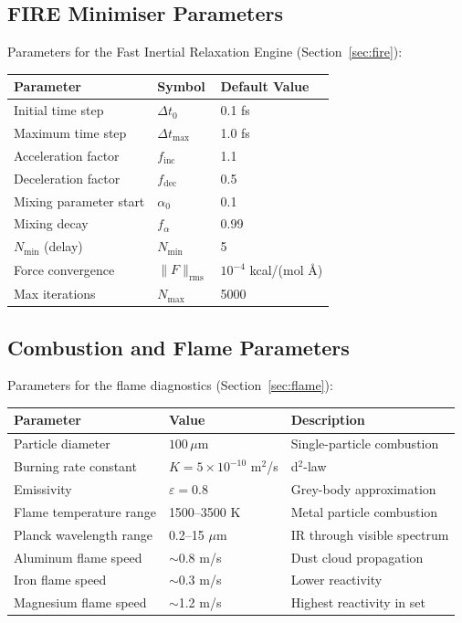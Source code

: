 \documentclass[11pt,a4paper]{article}
\begin{document}
\subsection{FIRE Minimiser Parameters}

Parameters for the Fast Inertial Relaxation Engine
(Section~\ref{sec:fire}):

\begin{center}
\begin{tabular}{lll}
\toprule
\textbf{Parameter} & \textbf{Symbol} & \textbf{Default Value} \\
\midrule
Initial time step      & $\Delta t_0$     & 0.1 fs \\
Maximum time step      & $\Delta t_{\max}$ & 1.0 fs \\
Acceleration factor    & $f_{\text{inc}}$  & 1.1 \\
Deceleration factor    & $f_{\text{dec}}$  & 0.5 \\
Mixing parameter start & $\alpha_0$        & 0.1 \\
Mixing decay           & $f_\alpha$        & 0.99 \\
$N_{\min}$ (delay)     & $N_{\min}$        & 5 \\
Force convergence      & $\|F\|_{\text{rms}}$ & $10^{-4}$ kcal/(mol \AA) \\
Max iterations         & $N_{\max}$        & 5000 \\
\bottomrule
\end{tabular}
\end{center}

\subsection{Combustion and Flame Parameters}

Parameters for the flame diagnostics
(Section~\ref{sec:flame}):

\begin{center}
\begin{tabular}{lll}
\toprule
\textbf{Parameter} & \textbf{Value} & \textbf{Description} \\
\midrule
Particle diameter        & $100\,\mu$m       & Single-particle combustion \\
Burning rate constant    & $K = 5 \times 10^{-10}$ m$^2$/s & d$^2$-law \\
Emissivity               & $\varepsilon = 0.8$  & Grey-body approximation \\
Flame temperature range  & 1500--3500 K       & Metal particle combustion \\
Planck wavelength range  & 0.2--15 $\mu$m     & IR through visible spectrum \\
Aluminum flame speed     & $\sim$0.8 m/s      & Dust cloud propagation \\
Iron flame speed         & $\sim$0.3 m/s      & Lower reactivity \\
Magnesium flame speed    & $\sim$1.2 m/s      & Highest reactivity in set \\
\bottomrule
\end{tabular}
\end{center}
\end{document}
